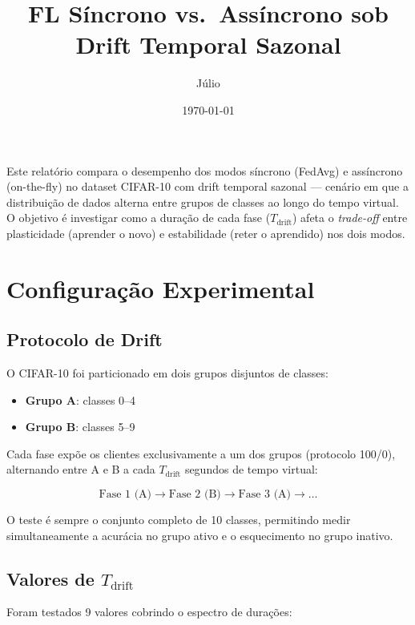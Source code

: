 \documentclass[12pt, a4paper]{article}
\title{\large\textbf{FL Síncrono vs.\ Assíncrono sob Drift Temporal Sazonal}}
\author{Júlio}
\date{\today}
\begin{document}
\maketitle

Este relatório compara o desempenho dos modos síncrono (FedAvg) e assíncrono
(on-the-fly) no dataset CIFAR-10 com drift temporal sazonal --- cenário em que
a distribuição de dados alterna entre grupos de classes ao longo do tempo
virtual. O objetivo é investigar como a duração de cada fase ($T_{\text{drift}}$)
afeta o \textit{trade-off} entre plasticidade (aprender o novo) e estabilidade
(reter o aprendido) nos dois modos.

\section{Configuração Experimental}

\subsection{Protocolo de Drift}

O CIFAR-10 foi particionado em dois grupos disjuntos de classes:

\begin{itemize}
    \item \textbf{Grupo A}: classes 0--4
    \item \textbf{Grupo B}: classes 5--9
\end{itemize}

Cada fase expõe os clientes exclusivamente a um dos grupos (protocolo 100/0),
alternando entre A e B a cada $T_{\text{drift}}$ segundos de tempo virtual:

\[
\text{Fase 1 (A)} \to \text{Fase 2 (B)} \to \text{Fase 3 (A)} \to \dots
\]

O teste é sempre o conjunto completo de 10 classes, permitindo medir
simultaneamente a acurácia no grupo ativo e o esquecimento no grupo inativo.

\subsection{Valores de $T_{\text{drift}}$}

Foram testados 9 valores cobrindo o espectro de durações:
\end{document}
